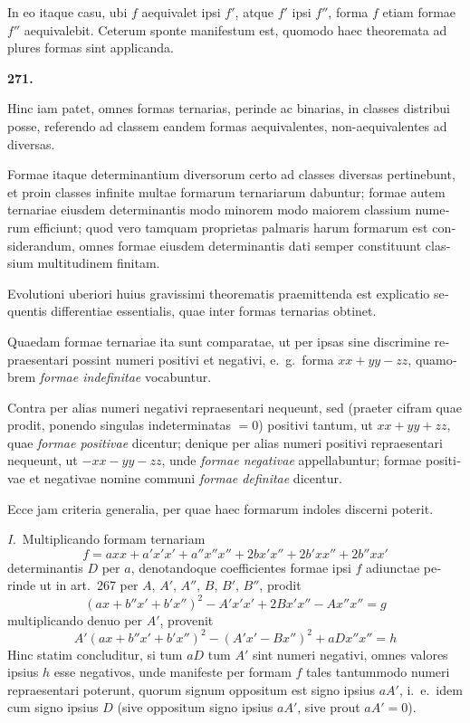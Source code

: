 \documentclass[12pt,a4paper]{article}
\theoremstyle{plain}
\theoremstyle{definition}
\theoremstyle{remark}
\begin{document}
\begin{otherlanguage}{latin}
In eo itaque casu, ubi $f$ aequivalet ipsi $f'$, atque $f'$ ipsi $f''$, forma $f$ etiam formae $f''$ aequivalebit. Ceterum sponte manifestum est, quomodo haec theoremata ad plures formas sint applicanda.

\end{otherlanguage}

\begin{otherlanguage}{latin}

\textbf{271.}

Hinc iam patet, omnes formas ternarias, perinde ac binarias, in classes distribui posse, referendo ad classem eandem formas aequivalentes, non-aequivalentes ad diversas.

Formae itaque determinantium diversorum certo ad classes diversas pertinebunt, et proin classes infinite multae formarum ternariarum dabuntur; formae autem ternariae eiusdem determinantis modo minorem modo maiorem classium numerum efficiunt; quod vero tamquam proprietas palmaris harum formarum est considerandum, omnes formae eiusdem determinantis dati semper constituunt classium multitudinem finitam.

Evolutioni uberiori huius gravissimi theorematis praemittenda est explicatio sequentis differentiae essentialis, quae inter formas ternarias obtinet.

Quaedam formae ternariae ita sunt comparatae, ut per ipsas sine discrimine repraesentari possint numeri positivi et negativi, e.\ g.\ forma $xx + yy - zz$, quamobrem \emph{formae indefinitae} vocabuntur.

Contra per alias numeri negativi repraesentari nequeunt, sed (praeter cifram quae prodit, ponendo singulas indeterminatas $= 0$) positivi tantum, ut $xx + yy + zz$, quae \emph{formae positivae} dicentur; denique per alias numeri positivi repraesentari nequeunt, ut $-xx - yy - zz$, unde \emph{formae negativae} appellabuntur; formae positivae et negativae nomine communi \emph{formae definitae} dicentur.

Ecce jam criteria generalia, per quae haec formarum indoles discerni poterit.

\textit{I.}\ Multiplicando formam ternariam
\[
f = axx + a'x'x' + a''x''x'' + 2bx'x'' + 2b'xx'' + 2b''xx'
\]
determinantis $D$ per $a$, denotandoque coefficientes formae ipsi $f$ adiunctae perinde ut in art.\ 267 per $A$, $A'$, $A''$, $B$, $B'$, $B''$, prodit
\[
(ax + b''x' + b'x'')^2 - A'x'x' + 2Bx'x'' - A x''x'' = g
\]
multiplicando denuo per $A'$, provenit
\[
A'(ax + b''x' + b'x'')^2 - (A'x' - Bx'')^2 + aDx''x'' = h
\]
Hinc statim concluditur, si tum $aD$ tum $A'$ sint numeri negativi, omnes valores ipsius $h$ esse negativos, unde manifeste per formam $f$ tales tantummodo numeri repraesentari poterunt, quorum signum oppositum est signo ipsius $aA'$, i.\ e.\ idem cum signo ipsius $D$ (sive oppositum signo ipsius $aA'$, sive prout $aA' = 0$).


\end{otherlanguage}
\end{document}

